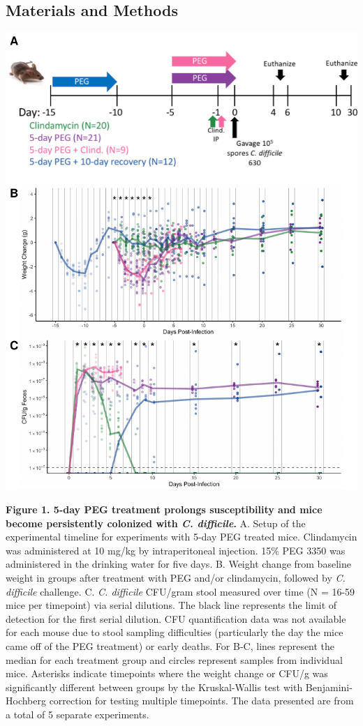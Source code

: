 \documentclass[
  11pt,
]{article}
\begin{document}
\hypertarget{materials-and-methods}{%
\subsection{Materials and Methods}\label{materials-and-methods}}

\newpage

\includegraphics{figure_1.pdf}

\textbf{Figure 1. 5-day PEG treatment prolongs susceptibility and mice
become persistently colonized with \emph{C. difficile}.} A. Setup of the
experimental timeline for experiments with 5-day PEG treated mice.
Clindamycin was administered at 10 mg/kg by intraperitoneal injection.
15\% PEG 3350 was administered in the drinking water for five days. B.
Weight change from baseline weight in groups after treatment with PEG
and/or clindamycin, followed by \emph{C. difficile} challenge. C.
\emph{C. difficile} CFU/gram stool measured over time (N = 16-59 mice
per timepoint) via serial dilutions. The black line represents the limit
of detection for the first serial dilution. CFU quantification data was
not available for each mouse due to stool sampling difficulties
(particularly the day the mice came off of the PEG treatment) or early
deaths. For B-C, lines represent the median for each treatment group and
circles represent samples from individual mice. Asterisks indicate
timepoints where the weight change or CFU/g was significantly different
between groups by the Kruskal-Wallis test with Benjamini-Hochberg
correction for testing multiple timepoints. The data presented are from
a total of 5 separate experiments. \newpage
\end{document}

